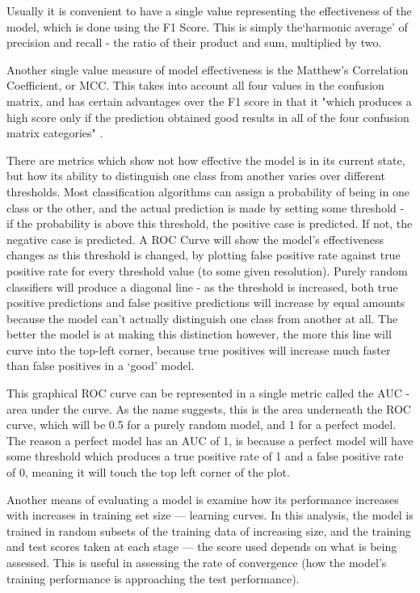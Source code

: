 Usually it is convenient to have a single value representing the effectiveness of the model, which is done using the F1 Score. This is simply the`harmonic average' of precision and recall - the ratio of their product and sum, multiplied by two.

Another single value measure of model effectiveness is the Matthew's Correlation Coefficient, or MCC. This takes into account all four values in the confusion matrix, and has certain advantages over the F1 score in that it "which produces a high score only if the prediction obtained good results in all of the four confusion matrix categories" . 

There are metrics which show not how effective the model is in its current state, but how its ability to distinguish one class from another varies over different thresholds. Most classification algorithms can assign a probability of being in one class or the other, and the actual prediction is made by setting some threshold - if the probability is above this threshold, the positive case is predicted. If not, the negative case is predicted. A ROC Curve will show the model's effectiveness changes as this threshold is changed, by plotting false positive rate against true positive rate for every threshold value (to some given resolution). Purely random classifiers will produce a diagonal line - as the threshold is increased, both true positive predictions and false positive predictions will increase by equal amounts because the model can't actually distinguish one class from another at all. The better the model is at making this distinction however, the more this line will curve into the top-left corner, because true positives will increase much faster than false positives in a `good' model.

This graphical ROC curve can be represented in a single metric called the AUC - area under the curve. As the name suggests, this is the area underneath the ROC curve, which will be 0.5 for a purely random model, and 1 for a perfect model. The reason a perfect model has an AUC of 1, is because a perfect model will have some threshold which produces a true positive rate of 1 and a false positive rate of 0, meaning it will touch the top left corner of the plot.

Another means of evaluating a model is examine how its performance increases with increases in training set size --- learning curves. In this analysis, the model is trained in random subsets of the training data of increasing size, and the training and test scores taken at each stage --- the score used depends on what is being assessed. This is useful in assessing the rate of convergence (how the model's training performance is approaching the test performance).

